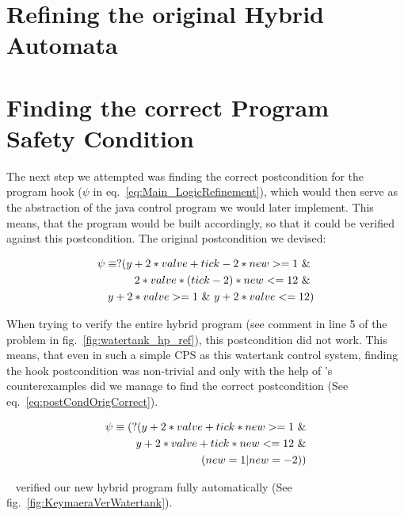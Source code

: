 \section{Refining the original Hybrid Automata}
\label{sec:Watertank:Refinining}

\section{Finding the correct Program Safety Condition}
\label{sec:Watertank:SafetyCond}

The next step we attempted was finding the correct postcondition for the program hook (\(\psi\) in eq.~\ref{eq:Main_LogicRefinement}), which would then serve as the abstraction of the java control program we would later implement. This means, that the program would be built accordingly, so that it could be verified against this postcondition. The original postcondition we devised:

\begin{equation}
	\centering
	\begin{split}
		\psi \equiv ?( y + 2* valve + tick -2 * new  >= 1~\&~ \\ 2 * valve * (tick - 2) * new <= 12~\&~ \\  y + 2* valve >= 1~\&~ y + 2 * valve <= 12) 
	\end{split}
\label{eq:postCondOrig}
\end{equation}

When trying to verify the entire hybrid program (see comment in line 5 of the problem in fig.~\ref{fig:watertank_hp_ref}), this postcondition did not work. This means, that even in such a simple CPS as this watertank control system, finding the hook postcondition was non-trivial and only with the help of \keym's counterexamples did we manage to find the correct postcondition (See eq.~\ref{eq:postCondOrigCorrect}). 

\begin{equation}
	\centering
	\begin{split}
		\psi \equiv (?(y + 2 * valve + tick * new >= 1~\& \\ y + 2 * valve + tick * new <= 12~\& \\(new = 1 | new = -2))
	\end{split}
	\label{eq:postCondOrigCorrect}
\end{equation}

\keym~ verified our new hybrid program fully automatically (See fig.~\ref{fig:KeymaeraVerWatertank}).

